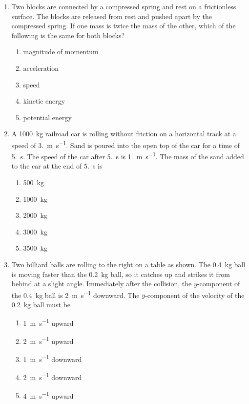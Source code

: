 \documentclass{../../../oss-apphys}
\begin{document}
\begin{multicols}{2}
\begin{enumerate}[leftmargin=18pt,resume]
  \item Two blocks are connected by a compressed spring and rest on a
    frictionless surface. The blocks are released from rest and pushed apart
    by the compressed spring. If one mass is twice the mass of the other,
    which of the following is the same for both blocks?
    \begin{enumerate}[noitemsep,topsep=0pt,leftmargin=18pt,label=(\Alph*)]
    \item magnitude of momentum
    \item acceleration
    \item speed
    \item kinetic energy
    \item potential energy
    \end{enumerate}
    
  \item A \SI{1000}{\kilo\gram} railroad car is rolling without friction on a
    horizontal track at a speed of \SI{3.}{\metre\per\second}. Sand is poured
    into the open top of the car for a time of \SI{5.}{\second}. The speed of
    the car after \SI{5.}{\second} is \SI{1.}{\metre\per\second}. The mass of
    the sand added to the car at the end of \SI{5.}{\second} is
    \begin{center}
    \end{center}
    \begin{enumerate}[noitemsep,topsep=0pt,leftmargin=18pt,label=(\Alph*)]
    \item\SI{500 }{\kilo\gram}
    \item\SI{1000}{\kilo\gram}
    \item\SI{2000}{\kilo\gram}
    \item\SI{3000}{\kilo\gram}
    \item\SI{3500}{\kilo\gram}
    \end{enumerate}
    
  \item Two billiard balls are rolling to the right on a table as shown. The
    \SI{.4}{\kilo\gram} ball is moving faster than the \SI{.2}{\kilo\gram}
    ball, so it catches up and strikes it from behind at a slight angle.
    Immediately after the collision, the $y$-component of the
    \SI{.4}{\kilo\gram} ball is \SI{2}{\metre\per\second} downward.
    The $y$-component of the velocity of the \SI{.2}{\kilo\gram} ball must be
    \begin{center}
    \end{center}
    \begin{enumerate}[noitemsep,topsep=0pt,leftmargin=18pt,label=(\Alph*)]
    \item \SI{1}{\metre\per\second} upward
    \item \SI{2}{\metre\per\second} upward
    \item \SI{1}{\metre\per\second} downward
    \item \SI{2}{\metre\per\second} downward
    \item \SI{4}{\metre\per\second} upward
    \end{enumerate}


\end{enumerate}
\end{multicols}
\end{document}
